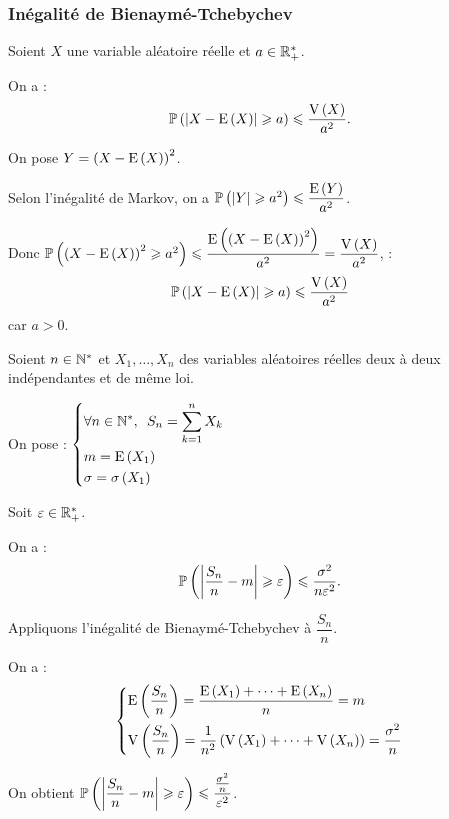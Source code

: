 \subsubsection{Inégalité de Bienaymé-Tchebychev}

\begin{prop}
Soient \(X\) une variable aléatoire réelle et \(a\in\Rps\).

On a : \[\proba{\abs{X-\esp{X}}\geq a}\leq\dfrac{\vari{X}}{a^2}.\]
\end{prop}

\begin{dem}
On pose \(Y=\paren{X-\esp{X}}^2\).

Selon l'inégalité de Markov, on a \(\proba{\abs{Y}\geq a^2}\leq\dfrac{\esp{Y}}{a^2}\).

Donc \(\proba{\paren{X-\esp{X}}^2\geq a^2}\leq\dfrac{\esp{\paren{X-\esp{X}}^2}}{a^2}=\dfrac{\vari{X}}{a^2}\), \cad : \[\proba{\abs{X-\esp{X}}\geq a}\leq\dfrac{\vari{X}}{a^2}\] car \(a>0\).
\end{dem}

\begin{appl}
Soient \(n\in\Ns\) et \(X_1,\dots,X_n\) des variables aléatoires réelles deux à deux indépendantes et de même loi.

On pose : \(\begin{dcases}
\quantifs{\forall n\in\Ns}S_n=\sum_{k=1}^nX_k \\
m=\esp{X_1} \\
\sigma=\ecarttype{X_1}
\end{dcases}\)

Soit \(\epsilon\in\Rps\).

On a : \[\proba{\abs{\dfrac{S_n}{n}-m}\geq\epsilon}\leq\dfrac{\sigma^2}{n\epsilon^2}.\]
\end{appl}

\begin{dem}
Appliquons l'inégalité de Bienaymé-Tchebychev à \(\dfrac{S_n}{n}\).

On a : \[\begin{dcases}
\esp{\dfrac{S_n}{n}}=\dfrac{\esp{X_1}+\dots+\esp{X_n}}{n}=m \\
\vari{\dfrac{S_n}{n}}=\dfrac{1}{n^2}\paren{\vari{X_1}+\dots+\vari{X_n}}=\dfrac{\sigma^2}{n}
\end{dcases}\]

On obtient \(\proba{\abs{\dfrac{S_n}{n}-m}\geq\epsilon}\leq\dfrac{\frac{\sigma^2}{n}}{\epsilon^2}\).
\end{dem}